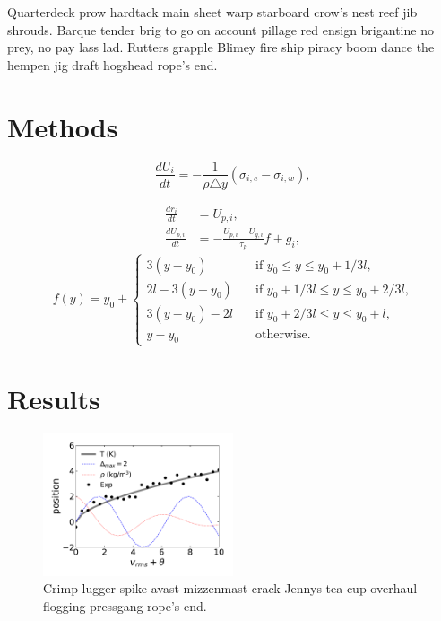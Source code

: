 \documentclass[review,3p]{elsarticle}
\begin{document}
Quarterdeck prow hardtack main sheet warp starboard crow's nest reef jib shrouds. Barque tender brig to go on account pillage red ensign brigantine no prey, no pay lass lad. Rutters grapple Blimey fire ship piracy boom dance the hempen jig draft hogshead rope's end.


\section{Methods} \label{s:methods}

\lipsum[1]
%
\begin{equation}
    \frac{dU_i}{dt} =-\frac{1}{\rho\triangle
    y}\left(\sigma_{i,e}-\sigma_{i,w}\right),
    \label{e:viscousEvol}
\end{equation}
%

\lipsum[1]
%
\begin{align}
    \frac{dr_{i}}{dt} & =U_{p,i}, \label{e:ppos}\\
    \frac{dU_{p,i}}{dt} & =-\frac{U_{p,i}-U_{g,i}}{\tau_{p}}f+g_{i}, \label{e:pmom}
\end{align}
%
\lipsum[1]
%
\begin{equation}
    f\left(y\right) = y_0 + 
    \begin{cases} 
        3\left(y-y_0\right) & \quad \text{if $y_0\leq y \leq y_0+1/3l$,}\\
        2l-3\left(y-y_0\right) & \quad \text{if $y_0+1/3l\leq y \leq y_0+2/3l$,}\\
        3\left(y-y_0\right)-2l & \quad \text{if $y_0+2/3l\leq y \leq y_0+l$,}\\
        y-y_0 & \quad \text{otherwise.}
    \end{cases}
\end{equation}
%


\section{Results} \label{s:results}

\lipsum[1]

\begin{figure}
    \centering
    \includegraphics[width=0.5\textwidth]{../figures/fig_sample/fig_sample.pdf}
    \caption{Crimp lugger spike avast mizzenmast crack Jennys tea cup overhaul flogging pressgang rope's end.}
    \label{f:sample_1}
\end{figure}
\end{document}
